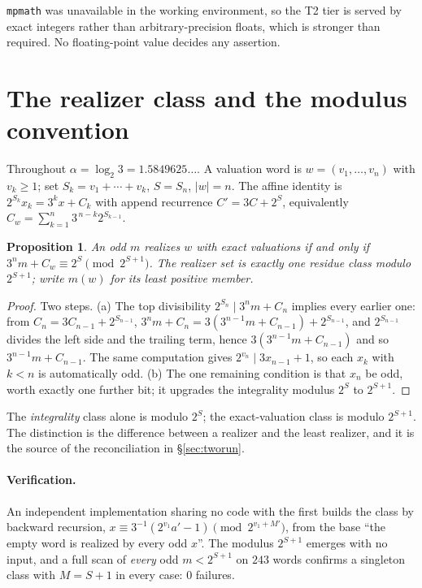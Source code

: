 \documentclass[11pt,a4paper]{article}
\theoremstyle{plain}
\newtheorem{proposition}{Proposition}
\theoremstyle{definition}
\newcommand{\al}{\alpha}
\begin{document}
\noindent\texttt{mpmath} was unavailable in the working environment, so the T2
tier is served by exact integers rather than arbitrary-precision floats, which
is stronger than required. No floating-point value decides any assertion.

\section{The realizer class and the modulus convention}\label{sec:class}

Throughout $\al=\log_2 3=1.5849625\dots$.
A valuation word is $w=(v_1,\dots,v_n)$ with $v_k\ge 1$; set
$S_k=v_1+\cdots+v_k$, $S=S_n$, $|w|=n$. The affine identity is
$2^{S_k}x_k=3^kx+C_k$ with append recurrence $C'=3C+2^{S}$, equivalently
$C_w=\sum_{k=1}^{n}3^{\,n-k}2^{S_{k-1}}$.

\begin{proposition}\label{prop:class}
An odd $m$ realizes $w$ with exact valuations if and only if
$3^nm+C_w\equiv 2^{S}\pmod{2^{S+1}}$. The realizer set is exactly one residue
class modulo $2^{S+1}$; write $m(w)$ for its least positive member.
\end{proposition}

\begin{proof}
Two steps. (a) The top divisibility $2^{S_n}\mid 3^nm+C_n$ implies every
earlier one: from $C_n=3C_{n-1}+2^{S_{n-1}}$,
$3^nm+C_n=3(3^{n-1}m+C_{n-1})+2^{S_{n-1}}$, and $2^{S_{n-1}}$ divides the left
side and the trailing term, hence $3(3^{n-1}m+C_{n-1})$ and so
$3^{n-1}m+C_{n-1}$. The same computation gives $2^{v_n}\mid 3x_{n-1}+1$, so
each $x_k$ with $k<n$ is automatically odd. (b) The one remaining condition is
that $x_n$ be odd, worth exactly one further bit; it upgrades the integrality
modulus $2^{S}$ to $2^{S+1}$.
\end{proof}

The \emph{integrality} class alone is modulo $2^{S}$; the exact-valuation class
is modulo $2^{S+1}$. The distinction is the difference between a realizer and
the least realizer, and it is the source of the reconciliation in
\S\ref{sec:tworun}.

\paragraph{Verification.}
An independent implementation sharing no code with the first builds the class by
backward recursion, $x\equiv 3^{-1}(2^{v_1}a'-1)\pmod{2^{v_1+M'}}$, from the
base ``the empty word is realized by every odd $x$''. The modulus $2^{S+1}$
emerges with no input, and a full scan of \emph{every} odd $m<2^{S+1}$ on $243$
words confirms a singleton class with $M=S+1$ in every case: $0$ failures.
\end{document}
